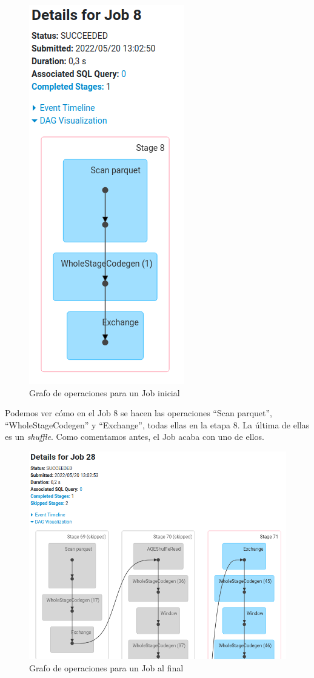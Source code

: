 \documentclass[12pt,twoside,titlepage]{report}
\newcommand{\quotes}[1]{``#1''}
\begin{document}
\begin{figure}
	\includegraphics[scale=0.3]{dag_temprano.png}
	\centering
	\caption{Grafo de operaciones para un Job inicial}
	\label{fig:dagearly}
\end{figure}

Podemos ver cómo en el Job 8 se hacen las operaciones \quotes{Scan parquet}, \quotes{WholeStageCodegen} y \quotes{Exchange}, todas ellas en la etapa 8. La última de ellas es un \textit{shuffle}. Como comentamos antes, el Job acaba con uno de ellos.

\begin{figure}[H]
	\includegraphics[scale=0.3]{dag_tardio.png}
	\centering
	\caption{Grafo de operaciones para un Job al final}
	\label{fig:daglate}
	\centering
\end{figure}
\end{document}
